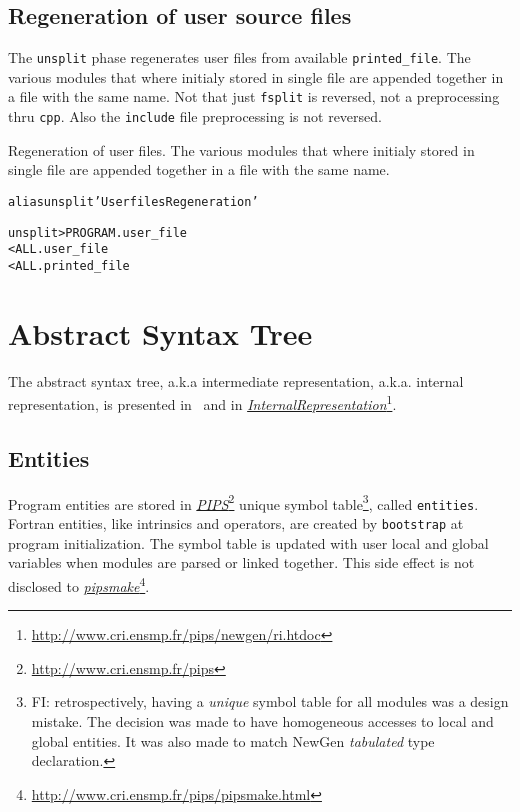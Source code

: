 \documentclass[a4paper]{report}
\newenvironment{PipsMake}{\begin{alltt}}{\end{alltt}}
\newcommand{\LINK}[2]{\href{#2}{#1}\footnote{\url{#2}}\xspace}
\newcommand{\PIPS}{\LINK{\emph{PIPS}}{http://www.cri.ensmp.fr/pips}}
\newcommand{\PIPSMAKE}{\LINK{\emph{pipsmake}}{http://www.cri.ensmp.fr/pips/pipsmake.html}\xspace}
\newcommand{\Pri}{\LINK{\emph{Internal\space{}Representation}}{http://www.cri.ensmp.fr/pips/newgen/ri.htdoc}}
\begin{document}
\section{Regeneration of user source files}
\label{sec:regen-user-source}


The \texttt{unsplit} phase regenerates user files from available
\verb|printed_file|. The various modules that where initialy stored in
single file are appended together in a file with the same name. Not that
just \texttt{fsplit} is reversed, not a preprocessing thru \texttt{cpp}.
Also the \texttt{include} file preprocessing is not reversed.


Regeneration of user files. The various modules that where initialy stored in
single file are appended together in a file with the same name.
\begin{PipsMake}

alias unsplit 'User files Regeneration'

unsplit                         > PROGRAM.user_file
                < ALL.user_file
                < ALL.printed_file
\end{PipsMake}

\chapter{Abstract Syntax Tree}
\label{section-abstract-syntax-tree}

The abstract syntax tree, a.k.a intermediate representation,
a.k.a. internal representation, is presented in~\cite{IJT92} and in \Pri{}.

\section{Entities}
\label{subsubsection-entities}

Program entities are stored in \PIPS{} unique symbol table\footnote{FI:
retrospectively, having a {\em unique} symbol table for all modules was
a design mistake. The decision was made to have homogeneous accesses to
local and global entities. It was also made to match NewGen {\em
tabulated} type declaration.}, called \verb+entities+. Fortran entities,
like intrinsics and operators, are created by \verb+bootstrap+ at
program initialization. The symbol table is updated with user local and
global variables when modules are parsed or linked together. This side
effect is not disclosed to \PIPSMAKE.
\end{document}
